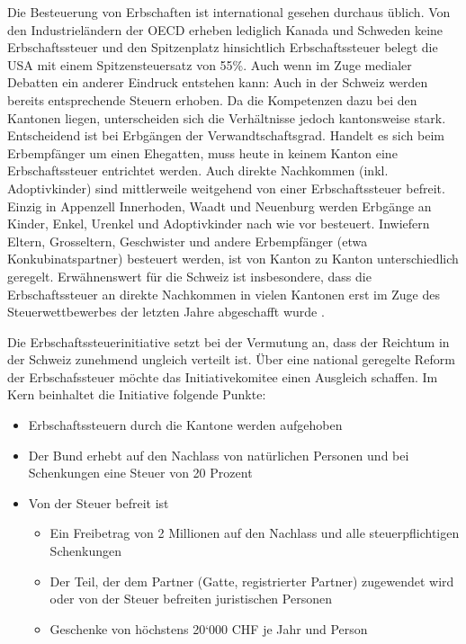 \documentclass[a4paper, 12pt,liststotoc]{scrartcl}
\numberwithin{equation}{section}
\begin{document}
Die Besteuerung von Erbschaften ist international gesehen durchaus
üblich. Von den Industrieländern der OECD erheben lediglich Kanada und
Schweden keine Erbschaftssteuer und den Spitzenplatz hinsichtlich
Erbschaftssteuer belegt die USA mit einem Spitzensteuersatz von 55\%. Auch wenn im Zuge medialer Debatten ein anderer Eindruck entstehen
kann: Auch in der Schweiz werden bereits entsprechende Steuern erhoben.
Da die Kompetenzen dazu bei den Kantonen liegen, unterscheiden sich die
Verhältnisse jedoch kantonsweise stark. Entscheidend ist bei Erbgängen
der Verwandtschaftsgrad. Handelt es sich beim Erbempfänger um einen
Ehegatten, muss heute in keinem Kanton eine Erbschaftssteuer entrichtet
werden. Auch direkte Nachkommen (inkl. Adoptivkinder) sind mittlerweile
weitgehend von einer Erbschaftssteuer befreit. Einzig in Appenzell
Innerhoden, Waadt und Neuenburg werden Erbgänge an Kinder, Enkel,
Urenkel und Adoptivkinder nach wie vor besteuert. Inwiefern Eltern,
Grosseltern, Geschwister und andere Erbempfänger (etwa
Konkubinatspartner) besteuert werden, ist von Kanton zu Kanton
unterschiedlich geregelt. Erwähnenswert für die Schweiz ist
insbesondere, dass die Erbschaftssteuer an direkte Nachkommen in vielen
Kantonen erst im Zuge des Steuerwettbewerbes der letzten Jahre
abgeschafft wurde \parencite{estv2013}.

Die Erbschaftssteuerinitiative setzt bei der Vermutung an, dass der
Reichtum in der Schweiz zunehmend ungleich verteilt ist. Über eine
national geregelte Reform der Erbschafssteuer möchte das
Initiativekomitee einen Ausgleich schaffen. Im Kern beinhaltet die
Initiative folgende Punkte:

\begin{itemize}
\item
  Erbschaftssteuern durch die Kantone werden aufgehoben
\item
  Der Bund erhebt auf den Nachlass von natürlichen Personen und bei
  Schenkungen eine Steuer von 20 Prozent
\item
  Von der Steuer befreit ist

  \begin{itemize}
  \item
    Ein Freibetrag von 2 Millionen auf den Nachlass und alle
    steuerpflichtigen Schenkungen
  \item
    Der Teil, der dem Partner (Gatte, registrierter Partner) zugewendet
    wird oder von der Steuer befreiten juristischen Personen
  \item
    Geschenke von höchstens 20`000 CHF je Jahr und Person
  \end{itemize}
\end{itemize}
\end{document}

